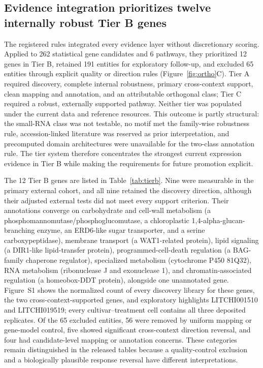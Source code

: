 \documentclass[11pt]{article}
\begin{document}
\subsection{Evidence integration prioritizes twelve internally robust Tier B genes}

The registered rules integrated every evidence layer without discretionary scoring. Applied to 262 statistical gene candidates and 6 pathways, they prioritized 12 genes in Tier B, retained 191 entities for exploratory follow-up, and excluded 65 entities through explicit quality or direction rules (Figure~\ref{fig:ortho}C). Tier A required discovery, complete internal robustness, primary cross-context support, clean mapping and annotation, and an attributable orthogonal class; Tier C required a robust, externally supported pathway. Neither tier was populated under the current data and reference resources. This outcome is partly structural: the small-RNA class was not testable, no motif met the family-wise robustness rule, accession-linked literature was reserved as prior interpretation, and precomputed domain architectures were unavailable for the two-class annotation rule. The tier system therefore concentrates the strongest current expression evidence in Tier B while making the requirements for future promotion explicit.

The 12 Tier B genes are listed in Table~\ref{tab:tierb}. Nine were measurable in the primary external cohort, and all nine retained the discovery direction, although their adjusted external tests did not meet every support criterion. Their annotations converge on carbohydrate and cell-wall metabolism (a phosphomannomutase/phosphoglucomutase, a chloroplastic 1,4-alpha-glucan-branching enzyme, an ERD6-like sugar transporter, and a serine carboxypeptidase), membrane transport (a WAT1-related protein), lipid signaling (a DIR1-like lipid-transfer protein), programmed-cell-death regulation (a BAG-family chaperone regulator), specialized metabolism (cytochrome P450 81Q32), RNA metabolism (ribonuclease J and exonuclease 1), and chromatin-associated regulation (a homeobox-DDT protein), alongside one unannotated gene. Figure~S1 shows the normalized count of every discovery library for these genes, the two cross-context-supported genes, and exploratory highlights LITCHI001510 and LITCHI019519; every cultivar--treatment cell contains all three deposited replicates. Of the 65 excluded entities, 56 were removed by uniform mapping or gene-model control, five showed significant cross-context direction reversal, and four had candidate-level mapping or annotation concerns. These categories remain distinguished in the released tables because a quality-control exclusion and a biologically plausible response reversal have different interpretations.
\end{document}
